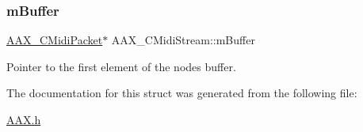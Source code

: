 \subsubsection{\texorpdfstring{mBuffer}{mBuffer}}
{\footnotesize\ttfamily \mbox{\hyperlink{a01429}{A\+A\+X\+\_\+\+C\+Midi\+Packet}}$\ast$ A\+A\+X\+\_\+\+C\+Midi\+Stream\+::m\+Buffer}



Pointer to the first element of the node\textquotesingle{}s buffer. 



The documentation for this struct was generated from the following file\+:\begin{DoxyCompactItemize}
\item 
\mbox{\hyperlink{a00392}{A\+A\+X.\+h}}\end{DoxyCompactItemize}
